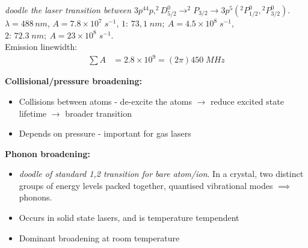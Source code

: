 \documentclass[a4paper, 11pt, normalem]{report}
\begin{document}
\begin{example}
    \textit{doodle the laser transition between $3p^44p,^2D_{5/2}^0 \to ^2P_{3/2} \to 3p^5({}^2P_{1/2}^0,{}^2P_{3/2}^0)$}.\\
    $\lambda = 488\,nm$, $A= 7.8\times10^7\;s^{-1}$, $1:\,73,1\;nm;~ A=4.5\times10^8\;s^{-1}$, $2:\,72.3\;nm;~ A=23\times10^8\;s^{-1}$.\\
    Emission linewidth:
    \begin{align}
        \sum A &= 2.8\times10^9 = (2\pi)450\;MHz
    \end{align}
\end{example}
\textbf{Collisional/pressure broadening:}
\begin{itemize}
    \item Collisions between atoms - de-excite the atoms $\to$ reduce excited state lifetime $\to$ broader transition
    \item Depends on pressure - important for gas lasers
\end{itemize}
\textbf{Phonon broadening:}
\begin{itemize}
    \item \textit{doodle of standard 1,2 transition for bare atom/ion}. In a crystal, two distinct groups of energy levels packed together, quantised vibrational modes $\implies$ phonons. 
    \item Occurs in solid state lasers, and is temperature tempendent
    \item Dominant broadening at room temperature
\end{itemize}
\end{document}
